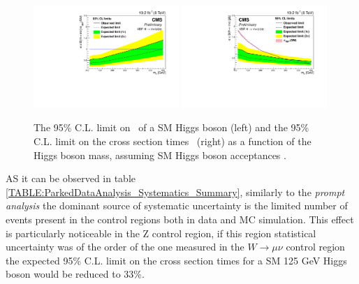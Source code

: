 \begin{figure}[!htb]
\centering
\includegraphics[width=0.49\textwidth]{Chapter07/Images/vbflimit.pdf}
\includegraphics[width=0.49\textwidth]{Chapter07/Images/vbfxslimit.pdf}
\caption{The 95\% C.L. limit on \BRinv\, of a SM Higgs boson (left) and the 95\% C.L. limit on the cross section times \BRinv\ (right) as a function of the Higgs boson mass, assuming SM Higgs boson acceptances \cite{ARTICLE:CMSVBFHiggsInvisibleParkedAnalysisPAS}.}
\label{FIGURE:ParkedDataAnalysis_Limits_VBFLimit}
\end{figure}

AS it can be observed in table \ref{TABLE:ParkedDataAnalysis_Systematics_Summary}, similarly to the \textit{prompt analysis} the dominant source of systematic uncertainty is the limited number of events present in the control regions both in data and \gls{MC} simulation. This effect is particularly noticeable in the Z control region, if this region statistical uncertainty was of the order of the one measured in the $W\rightarrow\mu\nu$ control region the expected 95\% C.L. limit on the cross section times \BRinv for a \gls{SM} 125 GeV Higgs boson would be reduced to 33\%.

